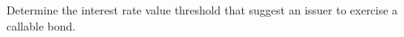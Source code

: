 \documentclass[12pt,a4paper]{book}
\begin{document}
%
%
%
%

\begin{exercise}[subtitle=To Exercise or Not To Exercise (\texttt{python})]
Determine the interest rate value threshold that suggest an issuer to exercise a callable bond.
\end{exercise}
\end{document}
